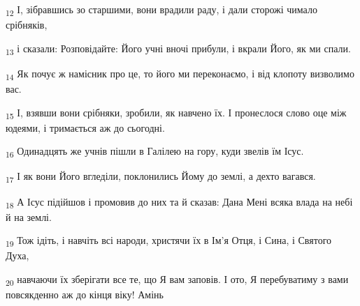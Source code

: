 \begin{tcolorbox}
\textsubscript{12} І, зібравшись зо старшими, вони врадили раду, і дали сторожі чимало срібняків,
\end{tcolorbox}
\begin{tcolorbox}
\textsubscript{13} і сказали: Розповідайте: Його учні вночі прибули, і вкрали Його, як ми спали.
\end{tcolorbox}
\begin{tcolorbox}
\textsubscript{14} Як почує ж намісник про це, то його ми переконаємо, і від клопоту визволимо вас.
\end{tcolorbox}
\begin{tcolorbox}
\textsubscript{15} І, взявши вони срібняки, зробили, як навчено їх. І пронеслося слово оце між юдеями, і тримається аж до сьогодні.
\end{tcolorbox}
\begin{tcolorbox}
\textsubscript{16} Одинадцять же учнів пішли в Галілею на гору, куди звелів їм Ісус.
\end{tcolorbox}
\begin{tcolorbox}
\textsubscript{17} І як вони Його вгледіли, поклонились Йому до землі, а дехто вагався.
\end{tcolorbox}
\begin{tcolorbox}
\textsubscript{18} А Ісус підійшов і промовив до них та й сказав: Дана Мені всяка влада на небі й на землі.
\end{tcolorbox}
\begin{tcolorbox}
\textsubscript{19} Тож ідіть, і навчіть всі народи, христячи їх в Ім'я Отця, і Сина, і Святого Духа,
\end{tcolorbox}
\begin{tcolorbox}
\textsubscript{20} навчаючи їх зберігати все те, що Я вам заповів. І ото, Я перебуватиму з вами повсякденно аж до кінця віку! Амінь
\end{tcolorbox}

